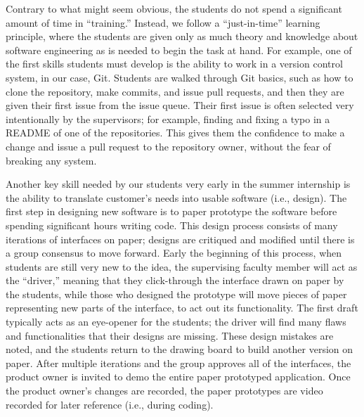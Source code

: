 Contrary to what might seem obvious, the students do not spend a significant amount of time in ``training.'' Instead, we follow a ``just-in-time'' learning principle, where the students are given only as much theory and knowledge about software engineering as is needed to begin the task at hand. For example, one of the first skills students must develop is the ability to work in a version control system, in our case, Git. Students are walked through Git basics, such as how to clone the repository, make commits, and issue pull requests, and then they are given their first issue from the issue queue. Their first issue is often selected very intentionally by the supervisors; for example, finding and fixing a typo in a README of one of the repositories. This gives them the confidence to make a change and issue a pull request to the repository owner, without the fear of breaking any system. 


Another key skill needed by our students very early in the summer internship is the ability to translate customer's needs into usable software (i.e., design). The first step in designing new software is to paper prototype \cite{2003paperPrototype} the software before spending significant hours writing code. This design process consists of many iterations of interfaces on paper; designs are critiqued and modified until there is a group consensus to move forward. Early the beginning of this process, when students are still very new to the idea, the supervising faculty member will act as the ``driver,'' meaning that they click-through the interface drawn on paper by the students, while those who designed the prototype will move pieces of paper representing new parts of the interface, to act out its functionality. The first draft typically acts as an eye-opener for the students; the driver will find many flaws and functionalities that their designs are missing. These design mistakes are noted, and the students return to the drawing board to build another version on paper. After multiple iterations and the group approves all of the interfaces, the product owner is invited to demo the entire paper prototyped application. Once the product owner's changes are recorded, the paper prototypes are video recorded for later reference (i.e., during coding). 

